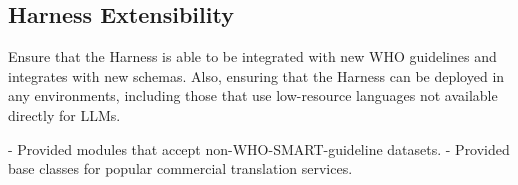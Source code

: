 
\subsection{Harness Extensibility}
Ensure that the Harness is able to be integrated with new WHO guidelines and integrates with new schemas. Also, ensuring that the Harness can be deployed in any environments, including those that use low-resource languages not available directly for LLMs.

- Provided modules that accept non-WHO-SMART-guideline datasets.
- Provided base classes for popular commercial translation services.





